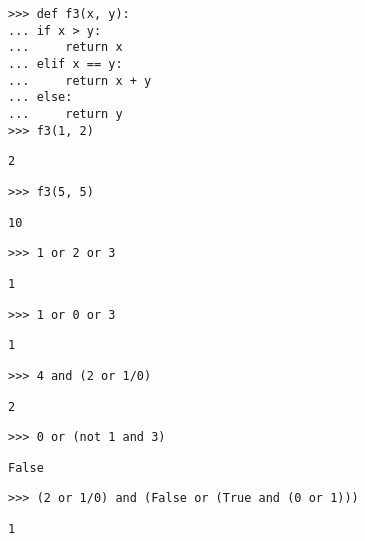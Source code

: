 \begin{lstlisting}
>>> def f3(x, y):
...	if x > y:
...		return x
...	elif x == y:
...		return x + y
...	else:
...		return y
>>> f3(1, 2)
\end{lstlisting}
\begin{solution}[.2in]
    \lstinline{2}
\end{solution}

\begin{lstlisting}
>>> f3(5, 5)
\end{lstlisting}
\begin{solution}[.2in]
    \lstinline{10}
\end{solution}

\begin{lstlisting}
>>> 1 or 2 or 3
\end{lstlisting}
\begin{solution}[.2in]
    \lstinline{1}
\end{solution}

\begin{lstlisting}
>>> 1 or 0 or 3
\end{lstlisting}
\begin{solution}[.2in]
    \lstinline{1}
\end{solution}

\begin{lstlisting}
>>> 4 and (2 or 1/0)
\end{lstlisting}
\begin{solution}[.2in]
    \lstinline{2}
\end{solution}

\begin{lstlisting}
>>> 0 or (not 1 and 3)
\end{lstlisting}
\begin{solution}[.2in]
    \lstinline{False}
\end{solution}

\begin{lstlisting}
>>> (2 or 1/0) and (False or (True and (0 or 1)))
\end{lstlisting}
\begin{solution}[.2in]
    \lstinline{1}
\end{solution}